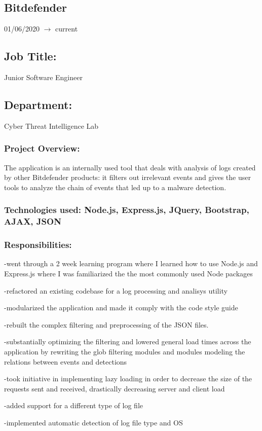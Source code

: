 \documentclass[a4paper,hidelinks,11pt]{article}
\begin{document}
\subsection{Bitdefender} 01/06/2020 $\rightarrow$ current
\subsection{Job Title:} Junior Software Engineer
\subsection{Department:} Cyber Threat Intelligence Lab
\subsubsection{Project Overview:}
The application is an internally used tool that deals with analysis of logs created by other Bitdefender products: it filters out irrelevant events and gives the user tools to analyze the chain of events that led up to a malware detection.
\subsubsection{Technologies used: Node.js, Express.js, JQuery, Bootstrap, AJAX, JSON}
\subsubsection{Responsibilities:}
-went through a 2 week learning program where I learned how to use Node.js and Express.js where I was familiarized the the most commonly used Node packages

-refactored an existing codebase for a log processing and analisys utility

-modularized the application and made it comply with the code style guide

-rebuilt the complex filtering and preprocessing of the JSON files.

-substantially optimizing the filtering and lowered general load times across the application by rewriting the glob filtering modules and modules modeling the relations between events and detections

-took initiative in implementing lazy loading in order to decrease the size of the requests sent and received, drastically decreasing server and client load

-added support for a different type of log file

-implemented automatic detection of log file type and OS
\end{document}
